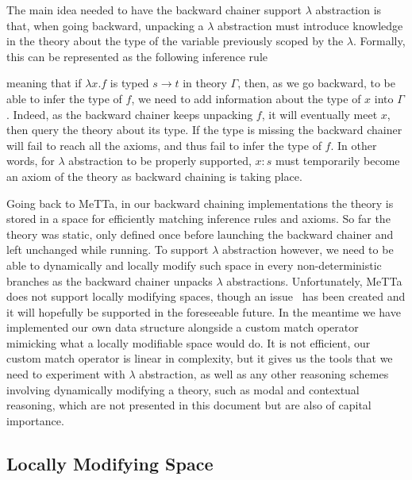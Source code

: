 \documentclass[]{report}
\begin{document}
The main idea needed to have the backward chainer support $\lambda$
abstraction is that, when going backward, unpacking a $\lambda$
abstraction must introduce knowledge in the theory about the type of
the variable previously scoped by the $\lambda$.  Formally, this can
be represented as the following inference rule
\begin{prooftree}
\end{prooftree}
meaning that if $\lambda x.f$ is typed $s \to t$ in theory $\Gamma$,
then, as we go backward, to be able to infer the type of $f$, we need
to add information about the type of $x$ into $\Gamma$.  Indeed, as
the backward chainer keeps unpacking $f$, it will eventually meet $x$,
then query the theory about its type.  If the type is missing the
backward chainer will fail to reach all the axioms, and thus fail to
infer the type of $f$.  In other words, for $\lambda$ abstraction to
be properly supported, $x: s$ must temporarily become an axiom of the
theory as backward chaining is taking place.

Going back to MeTTa, in our backward chaining implementations the
theory is stored in a space for efficiently matching inference rules
and axioms.  So far the theory was static, only defined once before
launching the backward chainer and left unchanged while running.  To
support $\lambda$ abstraction however, we need to be able to
dynamically and locally modify such space in every non-deterministic
branches as the backward chainer unpacks $\lambda$ abstractions.
Unfortunately, MeTTa does not support locally modifying spaces, though
an issue~\cite{TODO} has been created and it will hopefully be
supported in the foreseeable future.  In the meantime we have
implemented our own data structure alongside a custom match operator
mimicking what a locally modifiable space would do.  It is not
efficient, our custom match operator is linear in complexity, but it
gives us the tools that we need to experiment with $\lambda$
abstraction, as well as any other reasoning schemes involving
dynamically modifying a theory, such as modal and contextual
reasoning, which are not presented in this document but are also of
capital importance.

\subsection{Locally Modifying Space}
\end{document}
